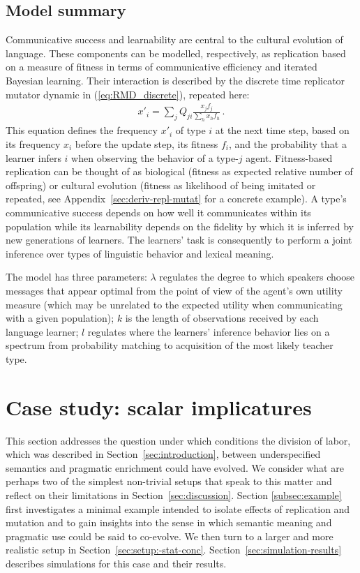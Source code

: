 \documentclass[a4paper, 11pt]{article}
\theoremstyle{Satz}
\begin{document}
\subsection{Model summary}

Communicative success and learnability are central to the cultural evolution of language. These
components can be modelled, respectively, as replication based on a measure of fitness in terms
of communicative efficiency and iterated Bayesian learning. Their interaction is described by
the discrete time replicator mutator dynamic in (\ref{eq:RMD_discrete}), repeated here:
\begin{align*}
  x'_i = \sum_j Q_{ji} \frac{x_jf_j}{\sum_h x_h f_h}\,.
\end{align*}
This equation defines the frequency $x'_i$ of type $i$ at the next time step, based on its
frequency $x_i$ before the update step, its fitness $f_i$, and the probability that a learner
infers $i$ when observing the behavior of a type-$j$ agent. Fitness-based replication can be thought of as
biological (fitness as expected relative number of offspring) or cultural evolution (fitness as
likelihood of being imitated or repeated, see Appendix~\ref{sec:deriv-repl-mutat} for a
concrete example). A type's communicative success depends on how well it communicates within its 
population while its learnability depends on the fidelity by which it is inferred by new
generations of learners. The learners' task is consequently to perform a joint inference over
types of linguistic behavior and lexical meaning.

The model has three parameters: $\lambda$ regulates the degree to which speakers
choose messages that appear optimal from the point of view of the agent's own utility measure
(which may be unrelated to the expected utility when communicating with a given population);
$k$ is the length of observations received by each language learner; $l$ regulates where the learners'
inference behavior lies on a spectrum from probability matching to acquisition of the most likely
teacher type.





\section{Case study: scalar implicatures}
\label{sec:si-case-study}

This section addresses the question under which conditions the division of labor, which was
described in Section~\ref{sec:introduction}, between underspecified semantics and pragmatic
enrichment could have evolved. We consider what are perhaps two of the simplest non-trivial
setups that speak to this matter and reflect on their limitations in
Section~\ref{sec:discussion}. Section \ref{subsec:example} first investigates a minimal example
intended to isolate effects of replication and mutation and to gain insights into the sense in
which semantic meaning and pragmatic use could be said to co-evolve. We then turn to a larger and
more realistic setup in
Section~\ref{sec:setup:-stat-conc}. Section~\ref{sec:simulation-results} describes simulations
for this case and their results.
\end{document}

